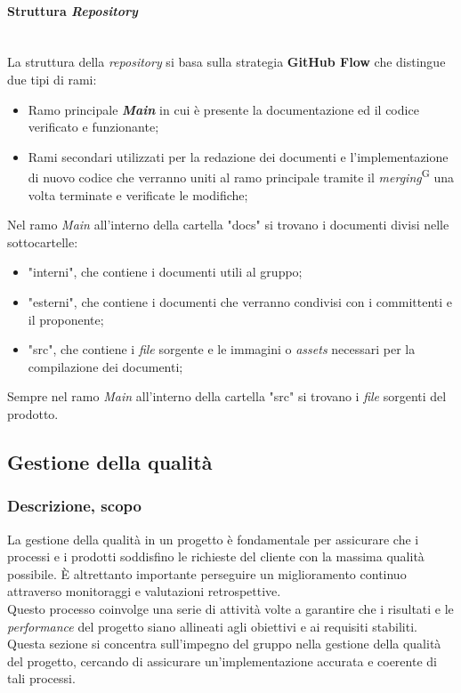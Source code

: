 \documentclass[5pt]{article}
\begin{document}
    \paragraph{Struttura \textit{Repository}}~\\
    La struttura della \textit{repository} si basa sulla strategia \textbf{GitHub Flow} che distingue due tipi di rami:
    \begin{itemize}
    	\item Ramo principale \textbf{\textit{Main}} in cui è presente la documentazione ed il codice verificato e funzionante;
    	\item Rami secondari utilizzati per la redazione dei documenti e l'implementazione di nuovo codice che verranno uniti al ramo principale tramite il \textit{merging}\textsuperscript{G} una volta terminate e verificate le modifiche;
    \end{itemize}
    Nel ramo \textit{Main} all'interno della cartella "docs" si trovano i documenti divisi nelle sottocartelle:
    \begin{itemize}
    	\item "interni", che contiene i documenti utili al gruppo;
    	\item "esterni", che contiene i documenti che verranno condivisi con i committenti e il proponente;
    	\item "src", che contiene i \textit{file} sorgente e le immagini o \textit{assets} necessari per la compilazione dei documenti;
    \end{itemize}
    Sempre nel ramo \textit{Main} all'interno della cartella "src" si trovano i \textit{file} sorgenti del prodotto.
    
\subsection{Gestione della qualità}
    \subsubsection{Descrizione, scopo}
    La gestione della qualità in un progetto è fondamentale per assicurare che i processi e i prodotti soddisfino le richieste del cliente con la massima qualità possibile. È altrettanto importante perseguire un miglioramento continuo attraverso monitoraggi e valutazioni retrospettive.\\Questo processo coinvolge una serie di attività volte a garantire che i risultati e le \textit{performance} del progetto siano allineati agli obiettivi e ai requisiti stabiliti. Questa sezione si concentra sull'impegno del gruppo nella gestione della qualità del progetto, cercando di assicurare un'implementazione accurata e coerente di tali processi.
\end{document}
